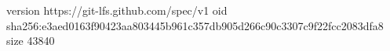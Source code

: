 version https://git-lfs.github.com/spec/v1
oid sha256:e3aed0163f90423aa803445b961c357db905d266c90c3307c9f22fcc2083dfa8
size 43840
